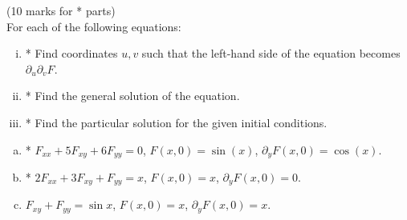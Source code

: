 \documentclass[12pt]{article}
\begin{document}
\bigskip

\begin{question}(10 marks for * parts)\\
For each of the following equations:
\begin{enumerate}[(i)]
\item * Find coordinates $u,v$ such that the left-hand side of the equation becomes $\partial_u\partial_vF$.
\item * Find the general solution of the equation.
\item * Find the particular solution for the given initial conditions.
\end{enumerate}
\begin{enumerate}[(a)]
\item * $F_{xx}+5F_{xy}+6F_{yy}=0$, $F(x,0)=\sin(x)$, $\partial_yF(x,0)=\cos(x)$.
\item * $2F_{xx}+3F_{xy}+F_{yy}=x$, $F(x,0)=x$, $\partial_yF(x,0)=0$.
\item $F_{xy}+F_{yy}=\sin x$, $F(x,0)=x$, $\partial_yF(x,0)=x$.
\end{enumerate}
\end{question}
\end{document}
